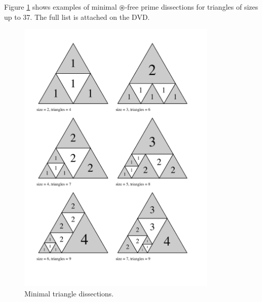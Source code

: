 \setcounter{chapter}{2}

Figure \ref{fig:min-triangle-dissections} shows examples of minimal $\circledast$-free prime dissections for triangles of sizes up to 37. The full list is attached on the DVD.

\bigskip

\begin{figure}[htb]
\centering
\includegraphics[trim=2em 4em 3em 2em, width=0.85\textwidth]{img/tranquility1.pdf}
\caption{Minimal triangle dissections.}
\label{fig:min-triangle-dissections}
\end{figure}

